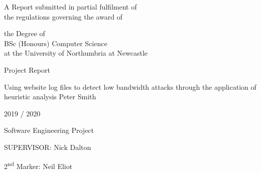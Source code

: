 
\begin{titlepage}
\Large
A Report submitted in partial fulfilment of\\
 the regulations governing the award of
\par
the Degree of\\[5mm]
{\huge	 BSc (Honours) Computer Science }\\[5mm]
at the University of Northumbria at Newcastle
\par
\vspace*{1in}
{\Large Project Report}
\par\vspace{1em}
{\Huge Using website log files to detect low bandwidth attacks through the application of heuristic analysis}
\vfill
Peter Smith
\par\vspace{1em}
2019 / 2020
\par\vspace{1em}
Software Engineering Project
\par\vspace{1em}
SUPERVISOR: Nick Dalton
\par
2\textsuperscript{\small nd} Marker: Neil Eliot
\end{titlepage}
